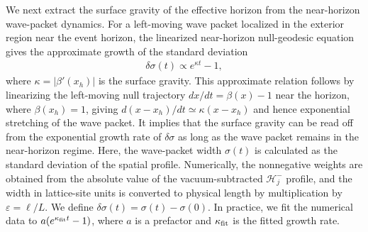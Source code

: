 \documentclass[reprint,amsmath,amssymb,aps,prb,floatfix,showkeys,superscriptaddress]{revtex4-2}
\begin{document}
We next extract the surface gravity of the effective horizon from the near-horizon wave-packet dynamics.
For a left-moving wave packet localized in the exterior region near the event horizon, the linearized near-horizon null-geodesic equation gives the approximate growth of the standard deviation
\begin{align}
    \delta\sigma(t) \propto e^{\kappa t}-1,
    \label{eq:sigma_kappa}
\end{align}
where $\kappa=|\beta'(x_h)|$ is the surface gravity.
This approximate relation follows by linearizing the left-moving null trajectory $dx/dt=\beta(x)-1$ near the horizon, where $\beta(x_h)=1$, giving $d(x-x_h)/dt\simeq\kappa(x-x_h)$ and hence exponential stretching of the wave packet.
It implies that the surface gravity can be read off from the exponential growth rate of $\delta\sigma$ as long as the wave packet remains in the near-horizon regime.
Here, the wave-packet width $\sigma(t)$ is calculated as the standard deviation of the spatial profile. Numerically, the nonnegative weights are obtained from the absolute value of the vacuum-subtracted $\mathcal{H}_j^-$ profile, and the width in lattice-site units is converted to physical length by multiplication by $\varepsilon=\ell/L$. We define $\delta\sigma(t)=\sigma(t)-\sigma(0)$.
In practice, we fit the numerical data to $a(e^{\kappa_{\rm fit}t}-1)$, where $a$ is a prefactor and $\kappa_{\rm fit}$ is the fitted growth rate.
\end{document}
